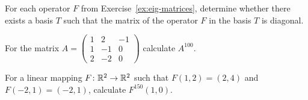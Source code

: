 \begin{exercise}
For each operator $F$ from Exercise~\ref{ex:eig-matrices}, determine whether there exists a basis $T$
such that the matrix of the operator $F$ in the basis $T$ is diagonal.
\end{exercise}

\begin{exercise}
For the matrix
$A = \left( \begin{array}{ccc} 1 & 2 & -1\\ 1 & -1 & 0\\ 2 & -2 & 0 \end{array} \right)$
calculate $A^{100}$.
\end{exercise}

\begin{exercise}
For a linear mapping $F\colon\mathbb{R}^2\to\mathbb{R}^2$ such that $F(1,2) = (2,4)$ and $F(-2,1) = (-2,1)$, calculate
$F^{150}(1,0)$.
\end{exercise}
